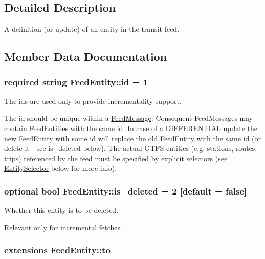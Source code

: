 \subsection{Detailed Description}
A definition (or update) of an entity in the transit feed. 

\subsection{Member Data Documentation}
\subsubsection[{\texorpdfstring{id}{id}}]{\setlength{\rightskip}{0pt plus 5cm}required string Feed\+Entity\+::id = 1}\hypertarget{structFeedEntity_ad96aa1c86c0940151a63b55e75bd9197}{}\label{structFeedEntity_ad96aa1c86c0940151a63b55e75bd9197}


The ids are used only to provide incrementality support. 

The id should be unique within a \hyperlink{structFeedMessage}{Feed\+Message}. Consequent Feed\+Messages may contain Feed\+Entities with the same id. In case of a D\+I\+F\+F\+E\+R\+E\+N\+T\+I\+AL update the new \hyperlink{structFeedEntity}{Feed\+Entity} with some id will replace the old \hyperlink{structFeedEntity}{Feed\+Entity} with the same id (or delete it -\/ see is\+\_\+deleted below). The actual G\+T\+FS entities (e.\+g. stations, routes, trips) referenced by the feed must be specified by explicit selectors (see \hyperlink{structEntitySelector}{Entity\+Selector} below for more info). 
\subsubsection[{\texorpdfstring{is\+\_\+deleted}{is_deleted}}]{\setlength{\rightskip}{0pt plus 5cm}optional bool Feed\+Entity\+::is\+\_\+deleted = 2 \mbox{[}default = false\mbox{]}}\hypertarget{structFeedEntity_aacce46cb6514b5ad2cf66559abdcfba3}{}\label{structFeedEntity_aacce46cb6514b5ad2cf66559abdcfba3}


Whether this entity is to be deleted. 

Relevant only for incremental fetches. 
\subsubsection[{\texorpdfstring{to}{to}}]{\setlength{\rightskip}{0pt plus 5cm}extensions Feed\+Entity\+::to}\hypertarget{structFeedEntity_a9fa773cfd301e2fa0ddb389df46d9bd4}{}\label{structFeedEntity_a9fa773cfd301e2fa0ddb389df46d9bd4}


